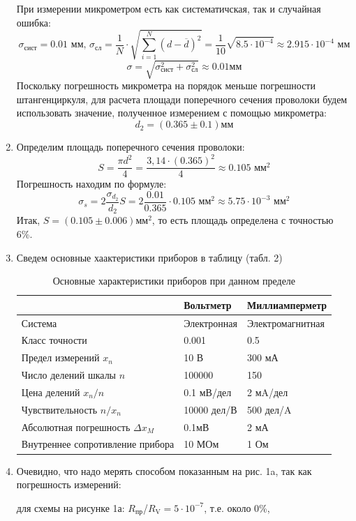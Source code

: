 \documentclass[a4paper, 10pt]{article}%
\begin{document}
\begin{enumerate}
При измерении микрометром есть как систематичская, так и случайная ошибка:
\[ \sigma_{\text{сист}}  = 0.01 \text{ мм, }
\sigma_{\text{сл}}  = \dfrac{1}{N} \cdot \sqrt{\sum_{i = 1}^N (d - \overline{d})^2} = \frac{1}{10}\sqrt{8.5\cdot10^{-4}} \approx 2.915\cdot10^{-4} \text{ мм}\]
\[ \sigma =  \sqrt{\sigma_{\text{сист}}^2 + \sigma_{\text{сл}}^2} \approx 0.01 \text{мм}\]
Поскольку погрешность микрометра на порядок меньше погрешности штангенциркуля, для расчета площади поперечного сечения проволоки будем использовать значение, полученное измерением с помощью микрометра:
\[ d_2 = (0.365 \pm 0.1) \text{мм}\]
\item Определим площадь поперечного сечения проволоки: 
\[ S = \dfrac{ \pi d^2 }{4} = \dfrac{3,14 \cdot (0.365)^2}{4} \approx 0.105 \text{ мм}^2\]
Погрешность находим по формуле:
\[ \sigma_{s} = 2\dfrac{\sigma_{d_2}}{d_2}S = 2\dfrac{0.01}{0.365} \cdot 0.105 \text{ мм}^2 \approx 5.75 \cdot10^{-3} \text{ мм}^2 \]
Итак, $S = \left(0.105 \pm 0.006\right) \text{мм}^2$, то есть площадь определена с точностью 6\%.
\item Сведем основные хаактеристики приборов в таблицу (табл. 2) \\
\begin{table}[h]
\caption{Основные характеристики приборов при данном пределе}
\centering
\begin{tabular}{|p{3cm}|p{5cm}|p{5cm}|}
\hline
& Вольтметр & Миллиамперметр \\
\hline
Система & Электронная & Электромагнитная\\
\hline
Класс точности & 0.001 & 0.5 \\
\hline
Предел измерений $ x_{n} $ & 10 В & 300 мА \\
\hline
Число делений шкалы $n$ & 100000 & 150 \\
\hline
Цена делений $x_n / n$ & 0.1 мВ/дел & 2 мA/дел \\
\hline
Чувствительность $ n / x_n$ & 10000 дел/В & 500 дел/A \\
\hline
Абсолютная погрешность $\Delta x_M$ & 0.1мВ & 2 мА \\
\hline
Внутреннее сопротивление прибора & 10 МОм & 1 Ом\\
\hline
\end{tabular}
\end{table}

\item Очевидно, что надо мерять способом показанным на рис. 1a, так как погрешность измерений:

для схемы на рисунке 1а: $R_{\text{пр}}$/$R_{\text{V}} = 5\cdot10^{-7}$, т.е. около 0\%,


\end{enumerate}
\end{document}
